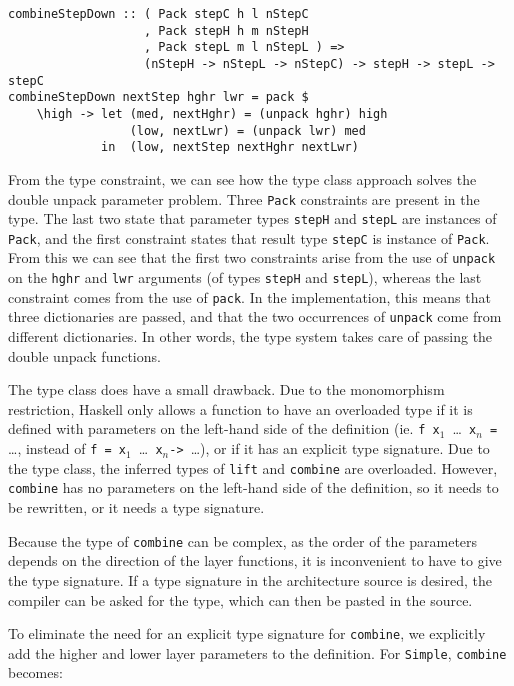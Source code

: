 \begin{small}
\begin{verbatim}
combineStepDown :: ( Pack stepC h l nStepC 
                   , Pack stepH h m nStepH
                   , Pack stepL m l nStepL ) => 
                   (nStepH -> nStepL -> nStepC) -> stepH -> stepL -> stepC
combineStepDown nextStep hghr lwr = pack $
    \high -> let (med, nextHghr) = (unpack hghr) high
                 (low, nextLwr) = (unpack lwr) med
             in  (low, nextStep nextHghr nextLwr)
\end{verbatim}
\end{small}

From the type constraint, we can see how the type class approach solves the double unpack parameter problem. Three \texttt{Pack} constraints are present in the type. The last two state that parameter types \texttt{stepH} and \texttt{stepL} are instances of \texttt{Pack}, and the first constraint states that result type \texttt{stepC} is instance of \texttt{Pack}. From this we can see that the first two constraints arise from the use of \texttt{unpack} on the \texttt{hghr} and \texttt{lwr} arguments (of types \texttt{stepH} and \texttt{stepL}), whereas the last constraint comes from the use of \texttt{pack}. In the implementation, this means that three dictionaries are passed, and that the two occurrences of \texttt{unpack} come from different dictionaries. In other words, the type system takes care of passing the double unpack functions.

The type class does have a small drawback. Due to the monomorphism restriction, Haskell only allows a function to have an overloaded type if it is defined with parameters on the left-hand side of the definition (ie. \texttt{f x$_1$~}\dots \texttt{~x$_n$ =} \dots, instead of \texttt{f = x$_1$~}\dots \texttt{~x$_n$}\verb|-> |\dots), or if it has an explicit type signature. Due to the type class, the inferred types of \texttt{lift} and \texttt{combine} are overloaded. However, \texttt{combine} has no parameters on the left-hand side of the definition, so it needs to be rewritten, or it needs a type signature.

Because the type of \texttt{combine} can be complex, as the order of the parameters depends on the direction of the layer functions, it is inconvenient to have to give the type signature. If a type signature in the architecture source is desired, the compiler can be asked for the type, which can then be pasted in the source.

To eliminate the need for an explicit type signature for \texttt{combine}, we explicitly add the higher and lower layer parameters to the definition. For \texttt{Simple}, \texttt{combine} becomes: 

